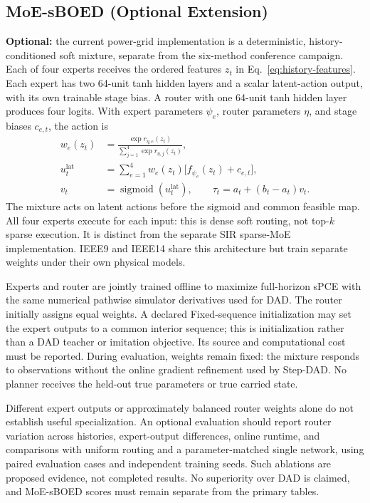 \documentclass[journal]{IEEEtran}
\begin{document}
\subsection{MoE-sBOED (Optional Extension)}
\label{sec:optional-moe}
\textbf{Optional:} the current power-grid implementation is a deterministic,
history-conditioned soft mixture, separate from the six-method conference
campaign. Each of four experts receives the ordered features $z_t$ in
Eq.~\eqref{eq:history-features}. Each expert has two 64-unit tanh hidden
layers and a scalar latent-action output, with its own trainable stage bias.
A router with one 64-unit tanh hidden layer produces four logits. With
expert parameters $\psi_e$, router parameters $\eta$, and stage biases
$c_{e,t}$, the action is
\begin{align}
w_e(z_t)&=\frac{\exp r_{\eta,e}(z_t)}
{\sum_{j=1}^{4}\exp r_{\eta,j}(z_t)},\\
u_t^{\mathrm{lat}}&=\sum_{e=1}^{4}w_e(z_t)
\bigl[f_{\psi_e}(z_t)+c_{e,t}\bigr],\\
v_t&=\operatorname{sigmoid}(u_t^{\mathrm{lat}}),\qquad
\tau_t=a_t+(b_t-a_t)v_t.
\label{eq:optional-moe-action}
\end{align}
The mixture acts on latent actions before the sigmoid and common feasible
map. All four experts execute for each input: this is dense soft routing,
not top-$k$ sparse execution. It is distinct from the separate SIR sparse-MoE
implementation. IEEE9 and IEEE14 share this architecture but train separate
weights under their own physical models.

Experts and router are jointly trained offline to maximize full-horizon sPCE
with the same numerical pathwise simulator derivatives used for DAD.
The router initially assigns equal weights. A declared Fixed-sequence
initialization may set the expert outputs to a common interior sequence;
this is initialization rather than a DAD teacher or imitation objective.
Its source and computational cost must be reported. During evaluation,
weights remain fixed: the mixture responds to observations without the
online gradient refinement used by Step-DAD. No planner receives the held-out
true parameters or true carried state.

Different expert outputs or approximately balanced router weights alone do
not establish useful specialization. An optional evaluation should report
router variation across histories, expert-output differences, online runtime,
and comparisons with uniform routing and a parameter-matched single network,
using paired evaluation cases and independent training seeds. Such ablations
are proposed evidence, not completed results. No superiority over DAD is
claimed, and MoE-sBOED scores must remain separate from the primary tables.
\end{document}
